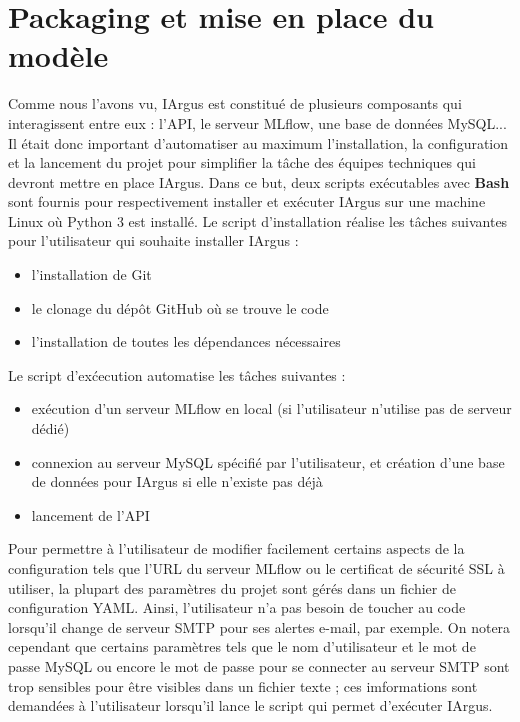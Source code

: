 \documentclass[french]{article}
\begin{document}
    \section{Packaging et mise en place du modèle}

    Comme nous l'avons vu, IArgus est constitué de plusieurs composants qui interagissent entre eux : l'API, le serveur MLflow, une base de données MySQL... Il était donc important d'automatiser au maximum l'installation, la configuration et la lancement du projet pour simplifier la tâche des équipes techniques qui devront mettre en place IArgus. Dans ce but, deux scripts exécutables avec \textbf{Bash} sont fournis pour respectivement installer et exécuter IArgus sur une machine Linux où Python 3 est installé. Le script d'installation réalise les tâches suivantes pour l'utilisateur qui souhaite installer IArgus :
    \begin{itemize}
        \item l'installation de Git
        \item le clonage du dépôt GitHub où se trouve le code
        \item l'installation de toutes les dépendances nécessaires
    \end{itemize} 

    Le script d'exćecution automatise les tâches suivantes :
    \begin{itemize}
        \item exécution d'un serveur MLflow en local (si l'utilisateur n'utilise pas de serveur dédié)
        \item connexion au serveur MySQL spécifié par l'utilisateur, et création d'une base de données pour IArgus si elle n'existe pas déjà
        \item lancement de l'API
    \end{itemize}

    Pour permettre à l'utilisateur de modifier facilement certains aspects de la configuration tels que l'URL du serveur MLflow ou le certificat de sécurité SSL à utiliser, la plupart des paramètres du projet sont gérés dans un fichier de configuration YAML. Ainsi, l'utilisateur n'a pas besoin de toucher au code lorsqu'il change de serveur SMTP pour ses alertes e-mail, par exemple. On notera cependant que certains paramètres tels que le nom d'utilisateur et le mot de passe MySQL ou encore le mot de passe pour se connecter au serveur SMTP sont trop sensibles pour être visibles dans un fichier texte ; ces imformations sont demandées à l'utilisateur lorsqu'il lance le script qui permet d'exécuter IArgus.
\end{document}
